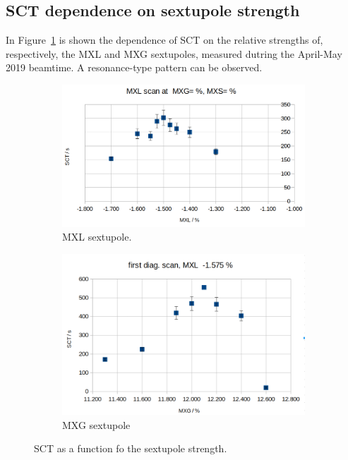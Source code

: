 \subsection{SCT dependence on sextupole strength}
In Figure~\ref{fig:SCT_scan} is shown the dependence of SCT on the relative strengths of, respectively, the 
MXL and MXG sextupoles, measured dutring the April-May 2019 beamtime. A resonance-type pattern can be observed.

\begin{figure}[h]\centering
	\begin{subfigure}{\linewidth}
		\includegraphics[height=.35\paperheight]{images/chapter4/SCT-April-2019/MXL_scan}
		\caption{MXL sextupole.}
	\end{subfigure}
	\begin{subfigure}{\linewidth}
		\includegraphics[width=.6\paperheight]{images/chapter4/SCT-April-2019/MXG_scan}
		\caption{MXG sextupole}
	\end{subfigure}
	\caption{SCT as a function fo the sextupole strength.\label{fig:SCT_scan}}
\end{figure}

